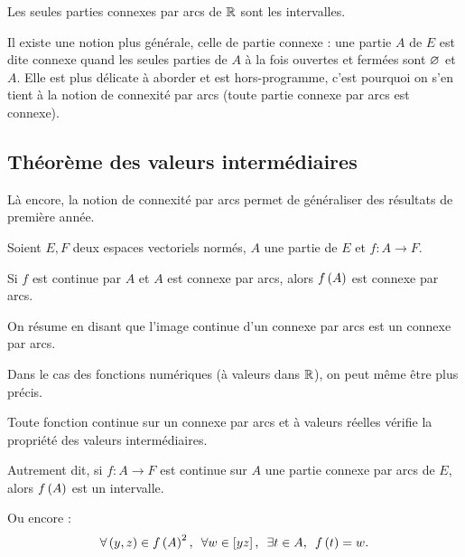 \begin{prop}
Les seules parties connexes par arcs de \(\mathbb{R}\) sont les intervalles.
\end{prop}

\begin{rem}
Il existe une notion plus générale, celle de partie connexe : une partie \(A\) de \(E\) est dite connexe quand les seules parties de \(A\) à la fois ouvertes et fermées sont \(\varnothing\) et \(A\). Elle est plus délicate à aborder et est hors-programme, c'est pourquoi on s'en tient à la notion de connexité par arcs (toute partie connexe par arcs est connexe).
\end{rem}

\subsection{Théorème des valeurs intermédiaires}

Là encore, la notion de connexité par arcs permet de généraliser des résultats de première année.

\begin{theo}
Soient \(E,F\) deux espaces vectoriels normés, \(A\) une partie de \(E\) et \(f:A\to F\).

Si \(f\) est continue par \(A\) et \(A\) est connexe par arcs, alors \(f\left(A\right)\) est connexe par arcs.
\end{theo}

On résume en disant que l'image continue d'un connexe par arcs est un connexe par arcs.

Dans le cas des fonctions numériques (\ie à valeurs dans \(\mathbb{R}\)), on peut même être plus précis.

\begin{theo}
Toute fonction continue sur un connexe par arcs et à valeurs réelles vérifie la propriété des valeurs intermédiaires.

Autrement dit, si \(f:A\to F\) est continue sur \(A\) une partie connexe par arcs de \(E\), alors \(f\left(A\right)\) est un intervalle.

Ou encore : \[\quantifs{\forall\paren{y,z}\in f\paren{A}^2;\forall w\in\croch{yz};\exists t\in A}f\paren{t}=w.\]
\end{theo}

